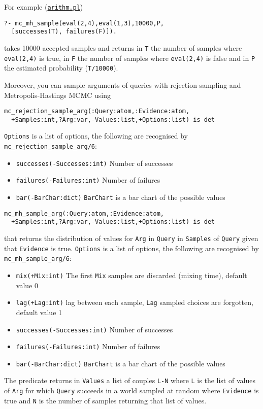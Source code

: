 For example (\href{http://cplint.eu/example/inference/arithm.pl}{\texttt{arithm.pl}})
\begin{verbatim}
?- mc_mh_sample(eval(2,4),eval(1,3),10000,P,
  [successes(T), failures(F)]).
\end{verbatim}
takes 10000 accepted samples and returns in \verb|T| the number of samples where
\verb|eval(2,4)| is true, in \verb|F| the number of samples where \verb|eval(2,4)| is false and in \verb|P| the
estimated probability (\verb|T/10000|).


Moreover, you can sample arguments of queries with rejection sampling and Metropolis-Hastings MCMC using
\begin{verbatim}
mc_rejection_sample_arg(:Query:atom,:Evidence:atom,
  +Samples:int,?Arg:var,-Values:list,+Options:list) is det
\end{verbatim}
\verb|Options| is a list of options, the following are recognised by \verb|mc_rejection_sample_arg/6|:
\begin{itemize}
\item \verb|successes(-Successes:int)|
Number of successes
\item \verb|failures(-Failures:int)|
Number of failures
\item \verb|bar(-BarChar:dict)|
    \verb|BarChart| is a bar chart of the possible values
\end{itemize}
\begin{verbatim}
mc_mh_sample_arg(:Query:atom,:Evidence:atom,
  +Samples:int,?Arg:var,-Values:list,+Options:list) is det
\end{verbatim}
that returns the distribution of values for \verb|Arg| in \verb|Query| in \verb|Samples| of
\verb|Query| given that \verb|Evidence| is true.
\verb|Options| is a list of options, the following are recognised by \verb|mc_mh_sample_arg/6|:
\begin{itemize}
\item \verb|mix(+Mix:int)|
The first  \verb|Mix| samples are discarded (mixing time), default value 0
\item \verb|lag(+Lag:int)|
lag between each sample, \verb|Lag| sampled choices are forgotten, default value 1
\item \verb|successes(-Successes:int)|
Number of successes
\item \verb|failures(-Failures:int)|
Number of failures
\item \verb|bar(-BarChar:dict)|
    \verb|BarChart| is a bar chart of the possible values
\end{itemize}
The predicate returns in \verb|Values| a list of couples \verb|L-N| where
\verb|L| is the list of values of \verb|Arg| for which \verb|Query|
succeeds in a world sampled at random where \verb|Evidence| is true and \verb|N|
is the number of samples returning that list of values.


